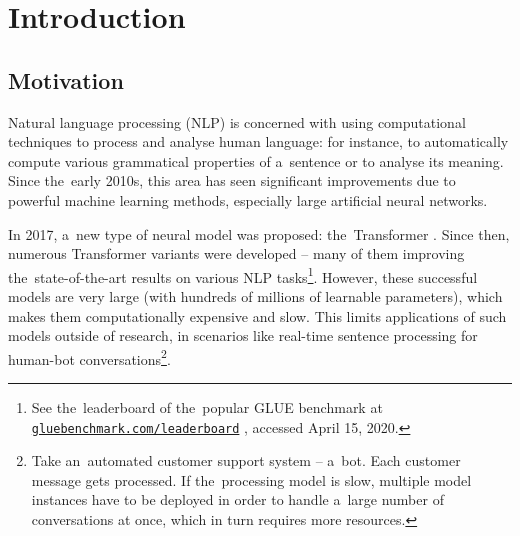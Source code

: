 \documentclass[bsc,frontabs,singlespacing,parskip,deptreport]{infthesis}
\newcommand\rurl[1]{%
  \href{https://#1}{\nolinkurl{#1}}%
}
\begin{document}
{
  \hypersetup{linkcolor=black}
  \tableofcontents
}

\chapter{Introduction}{
  \setcounter{page}{1}
  \section{Motivation}{
    Natural language processing (NLP) is concerned with using computational techniques to process and analyse human language: for instance, to automatically compute various grammatical properties of a~sentence or to analyse its meaning.
    Since the~early 2010s, this area has seen significant improvements due to powerful machine learning methods, especially large artificial neural networks.

    In 2017, a~new type of neural model was proposed: the~Transformer \citep{Vaswani_2017}. Since then, numerous Transformer variants were developed \citep{Radford_2018,Devlin_2018,Lan_2019,Liu_2019,Lample_2019} -- many of them improving the~state-of-the-art results on various NLP tasks\footnote{See the~leaderboard of the~popular GLUE benchmark \citep{Wang_2018} at \rurl{gluebenchmark.com/leaderboard}, accessed April 15, 2020.}.
    However, these successful models are very large (with hundreds of millions of learnable parameters), which makes them computationally expensive and slow. This limits applications of such models outside of research, in scenarios like real-time sentence processing for human-bot conversations\footnote{Take an~automated customer support system -- a~bot. Each customer message gets processed. If the~processing model is slow, multiple model instances have to be deployed in order to handle a~large number of conversations at once, which in turn requires more resources.}.

}}
\end{document}
